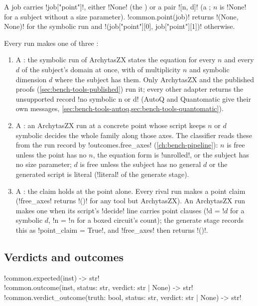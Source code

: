 A job carries \py!job["point"]!, either \py!None! (the ) or a pair \py![n, d]! (a ; $n$ is \py!None! for a subject without a size parameter). \py!common.point(job)! returns \py!(None, None)! for the symbolic run and \py!(job["point"][0], job["point"][1])! otherwise.

Every run makes one of three :
\begin{enumerate}
\item A : the symbolic run of ArchytasZX states the equation for every $n$ and every $d$ of the subject's domain at once, with \bboxes{} of multiplicity $n$ and symbolic dimension $d$ where the subject has them. Only ArchytasZX and the published proofs (\cref{sec:bench-tools-published}) run it; every other adapter returns the unsupported record \code!no symbolic n or d! (AutoQ and Quantomatic give their own messages, \cref{sec:bench-tools-autoq,sec:bench-tools-quantomatic}).
\item A : an ArchytasZX run at a concrete point whose script keeps $n$ or $d$ symbolic decides the whole family along those axes. The classifier reads these  from the run record by \py!outcomes.free_axes! (\cref{ch:bench-pipeline}): $n$ is free unless the point has no $n$, the equation form is \code!unrolled!, or the subject has no size parameter; $d$ is free unless the subject has no general $d$ or the generated script is literal (\code!literal! of the generate stage).
\item A : the claim holds at the point alone. Every rival run makes a point claim (\py!free_axes! returns \py!()! for any tool but ArchytasZX). An ArchytasZX run makes one when its script's \azx!decide! line carries point clauses (\code!d = !$d$ for a symbolic $d$, \code!n = !$n$ for a boxed circuit's count); the generate stage records this as \py!point_claim = True!, and \py!free_axes! then returns \py!()!.
\end{enumerate}

\subsection{Verdicts and outcomes}\label{sec:bench-tools-outcomes}

\begin{signature}
\py!common.expected(inst) -> str!\\
\py!common.outcome(inst, status: str, verdict: str | None) -> str!\\
\py!common.verdict_outcome(truth: bool, status: str, verdict: str | None) -> str!
\end{signature}

